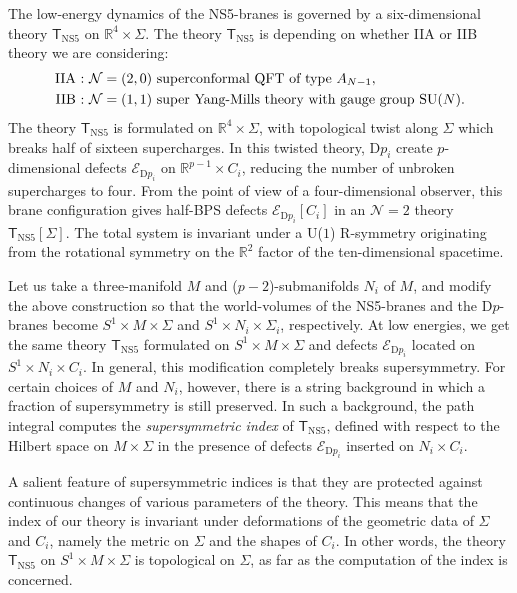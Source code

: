 The low-energy dynamics of the NS5-branes is governed by a six-dimensional
theory $\mathsf{T}_{\mathrm{NS5}}$ on $\mathbb{R}^{4}\times\Sigma$.
The theory $\mathsf{T}_{\mathrm{NS5}}$ is depending on whether IIA
or IIB theory we are considering:
\begin{align*}
  \textrm{IIA : }    &  \textrm{\ensuremath{\mathcal{N}  =  \left(2,0\right)} superconformal QFT of type \ensuremath{A_{N-1}}},  \\
  \textrm{IIB : }    &  \textrm{\ensuremath{\mathcal{N}  =  \left(1,1\right)}   super Yang-Mills theory with gauge group SU\ensuremath{\left(N\right)}}.
\end{align*}
 The theory $\mathsf{T}_{\mathrm{NS5}}$ is formulated on $\mathbb{R}^{4}\times\Sigma$,
with topological twist along $\Sigma$ which breaks half of sixteen
supercharges. In this twisted theory, D$p_{i}$ create $p$-dimensional
defects $\mathcal{E}_{\mathrm{D}p_{i}}$ on $\mathbb{R}^{p-1}\times C_{i}$,
reducing the number of unbroken supercharges to four. From the point
of view of a four-dimensional observer, this brane configuration gives
half-BPS defects $\mathcal{E}_{\mathrm{D}p_{i}}\left[C_{i}\right]$
in an $\mathcal{N}=2$ theory $\mathsf{T}_{\mathrm{NS5}}\left[\Sigma\right]$.
The total system is invariant under a U($1$) R-symmetry originating
from the rotational symmetry on the $\mathbb{R}^{2}$ factor of the
ten-dimensional spacetime.

Let us take a three-manifold $M$ and ($p-2$)-submanifolds $N_{i}$
of $M$, and modify the above construction so that the world-volumes
of the NS5-branes and the D$p$-branes become $S^{1}\times M\times\Sigma$
and $S^{1}\times N_{i}\times\Sigma_{i}$, respectively. At low energies,
we get the same theory $\mathsf{T}_{\mathrm{NS5}}$ formulated on
$S^{1}\times M\times\Sigma$ and defects $\mathcal{E}_{\mathrm{D}p_{i}}$
located on $S^{1}\times N_{i}\times C_{i}$. In general, this modification
completely breaks supersymmetry. For certain choices of $M$ and $N_{i}$,
however, there is a string background in which a fraction of supersymmetry
is still preserved. In such a background, the path integral computes
the \emph{supersymmetric index} of $\mathsf{T}_{\mathrm{NS5}}$, defined
with respect to the Hilbert space on $M\times\Sigma$ in the presence
of defects $\mathcal{E}_{\mathrm{D}p_{i}}$ inserted on $N_{i}\times C_{i}$.

A salient feature of supersymmetric indices is that they are protected
against continuous changes of various parameters of the theory. This
means that the index of our theory is invariant under deformations
of the geometric data of $\Sigma$ and $C_{i}$, namely the metric
on $\Sigma$ and the shapes of $C_{i}$. In other words, the theory
$\mathsf{T}_{\mathrm{NS5}}$ on $S^{1}\times M\times\Sigma$ is topological
on $\Sigma$, as far as the computation of the index is concerned.

